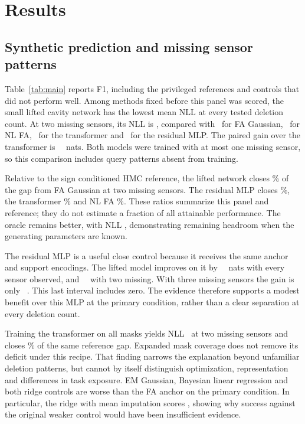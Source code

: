 \section{Results}
\label{sec:results}

\subsection{Synthetic prediction and missing sensor patterns}
\label{sec:exp-main}



Table~\ref{tab:main} reports F1, including the privileged references and controls that did not perform well. Among methods fixed before this panel was scored, the small lifted cavity network has the lowest mean NLL at every tested deletion count. At two missing sensors, its NLL is \FliftOnekc, compared with \FfaOnekc\ for FA Gaussian, \Fnlfakc\ for NL FA, \Fpfnkc\ for the transformer and \Fanchormlpkc\ for the residual MLP. The paired gain over the transformer is \MainkKTwoliftvspfn\ \MainkKTwoliftvspfnci\ nats. Both models were trained with at most one missing sensor, so this comparison includes query patterns absent from training.

Relative to the sign conditioned HMC reference, the lifted network closes \GapliftOne\% of the gap from FA Gaussian at two missing sensors. The residual MLP closes \Gapanchormlp\%, the transformer \Gappfn\% and NL FA \Gapnlfa\%. These ratios summarize this panel and reference; they do not estimate a fraction of all attainable performance. The oracle remains better, with NLL \Foraclekc, demonstrating remaining headroom when the generating parameters are known.

The residual MLP is a useful close control because it receives the same anchor and support encodings. The lifted model improves on it by \MainkKZeroliftvsmlpabs\ \MainkKZeroliftvsmlpci\ nats with every sensor observed, and \MainkKTwoliftvsmlpabs\ \MainkKTwoliftvsmlpci\ with two missing. With three missing sensors the gain is only \MainkKThreeliftvsmlp\ \MainkKThreeliftvsmlpci. This last interval includes zero. The evidence therefore supports a modest benefit over this MLP at the primary condition, rather than a clear separation at every deletion count.

Training the transformer on all masks yields NLL \Fpfnallkc\ at two missing sensors and closes \Gappfnall\% of the same reference gap. Expanded mask coverage does not remove its deficit under this recipe. That finding narrows the explanation beyond unfamiliar deletion patterns, but cannot by itself distinguish optimization, representation and differences in task exposure. EM Gaussian, Bayesian linear regression and both ridge controls are worse than the FA anchor on the primary condition. In particular, the ridge with mean imputation scores \Fridgerepokc, showing why success against the original weaker control would have been insufficient evidence.

